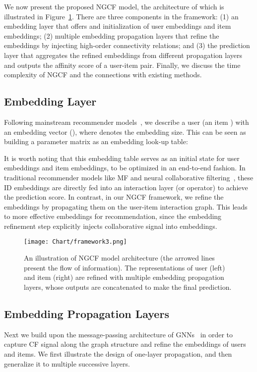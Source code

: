 \documentclass[sigconf]{acmart}
\theoremstyle{definition}
\begin{document}
We now present the proposed NGCF model, the architecture of which is illustrated in Figure~\ref{fig:embedding-propagation}.
There are three components in the framework:
(1) an embedding layer that offers and initialization of user embeddings and item embeddings; 
(2) multiple embedding propagation layers that refine the embeddings by
injecting high-order connectivity relations;
and (3) the prediction layer that aggregates the refined embeddings from different propagation layers and outputs the affinity score of a user-item pair.
Finally, we discuss the time complexity of NGCF and the connections with existing methods.

\subsection{Embedding Layer}
Following mainstream recommender models~\cite{BPRMF,NCF,KTUP}, we describe a user  (an item ) with an embedding vector  (), where   denotes the embedding size.
This can be seen as building a parameter matrix as an embedding look-up table: 

It is worth noting that this embedding table serves as an initial state for user embeddings and item embeddings, to be optimized in an end-to-end fashion. 
In traditional recommender models like MF and neural collaborative filtering~\cite{NCF}, these ID embeddings are directly fed into an interaction layer (or operator) to achieve the prediction score. 
In contrast, in our NGCF framework, we refine the embeddings by propagating them on the user-item interaction graph. This leads to more effective embeddings for recommendation, since the embedding refinement step explicitly injects collaborative signal into embeddings. 

\begin{figure}[t]
\centering
\texttt{[image: Chart/framework3.png]}
\vspace{-10pt}
\caption{An illustration of NGCF model architecture  (the arrowed lines present the flow of information). The representations of user  (left) and item  (right) are refined with multiple embedding propagation layers, whose outputs are  concatenated to make the final prediction.
}
\label{fig:embedding-propagation}
\vspace{-15pt}
\end{figure}

\subsection{Embedding Propagation Layers}
Next we build upon the message-passing architecture of GNNs~\cite{GraphSAGE,JumpKG} in order to capture CF signal along the graph structure and refine the embeddings of users and items. We first illustrate the design of one-layer propagation, and then generalize it to multiple successive layers. 
\end{document}

